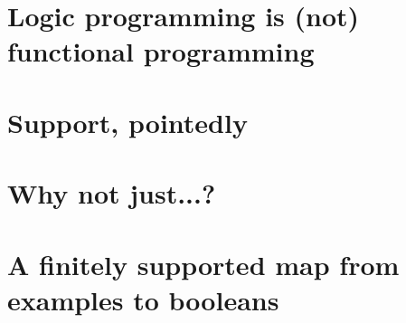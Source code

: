 \documentclass[runningheads]{llncs}
\newcommand\fslang{\ensuremath{\lambda_{\mathrm{FS}}}}
\newcommand\<\:                 %
\begin{document}

\section{Logic programming is (not) functional programming}


\section{Support, pointedly}


\section{Why not just...?}


\section{A finitely supported map from examples to booleans}


\end{document}

